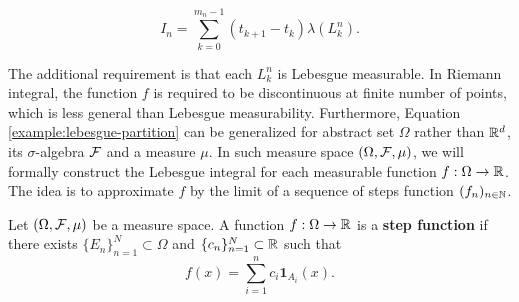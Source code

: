\begin{equation}
  \label{example:lebesgue-partition}
  I_n=\sum\limits_{k=0}^{m_n-1}(t_{k+1}-t_k)\lambda(L_k^n).
\end{equation}

The additional requirement is that each $L^n_k$ is Lebesgue measurable. In Riemann integral, the function $f$ is required to be discontinuous at finite number of points, which is less general than Lebesgue measurability. Furthermore, Equation \ref{example:lebesgue-partition} can be generalized for abstract set $\Omega$ rather than $\mathbb{R}^d$, its $\sigma$-algebra $\mathcal{F}$ and a measure $\mu$. In such measure space $(\Omega, \mathcal{F}, \mu)$, we will formally construct the Lebesgue integral for each measurable function $f:\Omega\to\mathbb{R}$. The idea is to approximate $f$ by the limit of a sequence of steps function $(f_n)_{n\in\mathbb{N}}$.

\begin{definition}
  Let $(\Omega, \mathcal{F}, \mu)$ be a measure space. A function $f:\Omega\to\mathbb{R}$ is a \textbf{step function} if there exists $\{E_n\}_{n=1}^N\subset\Omega$ and $\{c_n\}_{n=1}^N\subset\mathbb{R}$ such that
  \begin{equation}
    f(x)=\sum\limits_{i=1}^nc_i\mathbf{1}_{A_i}(x).
  \end{equation}
\end{definition}

